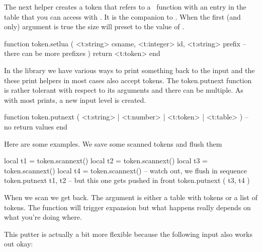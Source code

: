 The next helper creates a token that refers to a \LUA\ function with an entry in
the table that you can access with . It is the
companion to \type {\luadef}. When the first (and only) argument is true the size
will preset to the value of .

\starttyping[option=LUA]
function token.setlua (
    <t:string>  csname,
    <t:integer> id,
    <t:string>  prefix
 -- there can be more prefixes
)
    return <t:token>
end
\stoptyping


\stopsubsection

\startsubsection[title={Writers}]

In the  library we have various ways to print something back to the
input and the these print helpers in most cases also accept tokens. The \type
{token.putnext} function is rather tolerant with respect to its arguments and
there can be multiple. As with most prints, a new input level is created.

\starttyping[option=LUA]
function token.putnext ( <t:string> | <t:number> | <t:token> | <t:table> )
    -- no return values
end
\stoptyping

Here are some examples. We save some scanned tokens and flush them

\starttyping
local t1 = token.scannext()
local t2 = token.scannext()
local t3 = token.scannext()
local t4 = token.scannext()
-- watch out, we flush in sequence
token.putnext { t1, t2 }
-- but this one gets pushed in front
token.putnext ( t3, t4 )
\stoptyping

When we scan  we get  back. The argument is either a
table with tokens or a list of tokens. The  function will
trigger expansion but what happens really depends on what you're doing where.

This putter is actually a bit more flexible because the following input also
works out okay:

\startbuffer
\def\foo#1{[#1]}

\stopbuffer

